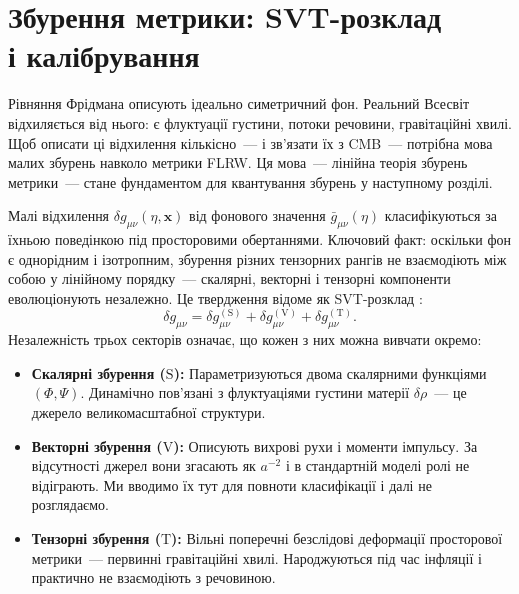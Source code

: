 \documentclass[12pt, a4paper]{article}
\begin{document}
\section{Збурення метрики: SVT-розклад\\ і калібрування}
\label{sec:metric}

Рівняння Фрідмана описують ідеально симетричний фон.
Реальний Всесвіт відхиляється від нього: є флуктуації густини,
потоки речовини, гравітаційні хвилі. Щоб описати ці відхилення
кількісно~--- і зв'язати їх з CMB~--- потрібна мова малих збурень
навколо метрики FLRW. Ця мова~--- лінійна теорія збурень метрики~---
стане фундаментом для квантування збурень у наступному розділі.

Малі відхилення $\delta g_{\mu\nu}(\eta, \mathbf{x})$ від
фонового значення $\bar{g}_{\mu\nu}(\eta)$ класифікуються за
їхньою поведінкою під просторовими обертаннями. Ключовий факт:
оскільки фон є однорідним і ізотропним, збурення різних
тензорних рангів не взаємодіють між собою у лінійному порядку~---
скалярні, векторні і тензорні компоненти еволюціонують
незалежно. Це твердження відоме як SVT-розклад
\cite{stewart_walker_1974}:
\begin{equation}\label{eq:svt_decomposition}
  \delta g_{\mu\nu}
    = \delta g_{\mu\nu}^{(\mathrm{S})}
    + \delta g_{\mu\nu}^{(\mathrm{V})}
    + \delta g_{\mu\nu}^{(\mathrm{T})}.
\end{equation}
Незалежність трьох секторів означає, що кожен з них можна
вивчати окремо:
\begin{itemize}
  \item \textbf{Скалярні збурення ($\mathrm{S}$):}
        Параметризуються двома скалярними функціями
        $(\Phi, \Psi)$. Динамічно пов'язані з флуктуаціями
        густини матерії $\delta\rho$~--- це джерело
        великомасштабної структури.
  \item \textbf{Векторні збурення ($\mathrm{V}$):}
        Описують вихрові рухи і моменти імпульсу. За
        відсутності джерел вони згасають як $a^{-2}$
        \cite{mukhanov_2005} і в стандартній моделі ролі не
        відіграють. Ми вводимо їх тут для повноти
        класифікації і далі не розглядаємо.
  \item \textbf{Тензорні збурення ($\mathrm{T}$):}
        Вільні поперечні безслідові деформації просторової
        метрики~--- первинні гравітаційні хвилі. Народжуються
        під час інфляції і практично не взаємодіють з
        речовиною.
\end{itemize}
\end{document}
